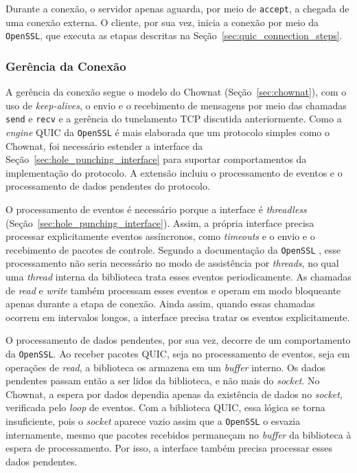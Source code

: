 Durante a conexão, o servidor apenas aguarda, por meio de \texttt{accept}, a chegada de uma conexão externa. O cliente, por sua vez, inicia a conexão por meio da \texttt{OpenSSL}, que executa as etapas descritas na Seção~\ref{sec:quic_connection_steps}.

\subsubsection{Gerência da Conexão}

A gerência da conexão segue o modelo do Chownat (Seção~\ref{sec:chownat}), com o uso de \textit{keep-alives}, o envio e o recebimento de mensagens por meio das chamadas \texttt{send} e \texttt{recv} e a gerência do tunelamento TCP discutida anteriormente. Como a \textit{engine} QUIC da \texttt{OpenSSL} é mais elaborada que um protocolo simples como o Chownat, foi necessário estender a interface da Seção~\ref{sec:hole_punching_interface} para suportar comportamentos da implementação do protocolo. A extensão incluiu o processamento de eventos e o processamento de dados pendentes do protocolo.

O processamento de eventos é necessário porque a interface é \textit{threadless} (Seção~\ref{sec:hole_punching_interface}). Assim, a própria interface precisa processar explicitamente eventos assíncronos, como \textit{timeouts} e o envio e o recebimento de pacotes de controle. Segundo a documentação da \texttt{OpenSSL} \citep{openssl_ssl_handle_events}, esse processamento não seria necessário no modo de assistência por \textit{threads}, no qual uma \textit{thread} interna da biblioteca trata esses eventos periodicamente. As chamadas de \textit{read} e \textit{write} também processam esses eventos e operam em modo bloqueante apenas durante a etapa de conexão. Ainda assim, quando essas chamadas ocorrem em intervalos longos, a interface precisa tratar os eventos explicitamente.

O processamento de dados pendentes, por sua vez, decorre de um comportamento da \texttt{OpenSSL}. Ao receber pacotes QUIC, seja no processamento de eventos, seja em operações de \textit{read}, a biblioteca os armazena em um \textit{buffer} interno. Os dados pendentes passam então a ser lidos da biblioteca, e não mais do \textit{socket}. No Chownat, a espera por dados dependia apenas da existência de dados no \textit{socket}, verificada pelo \textit{loop} de eventos. Com a biblioteca QUIC, essa lógica se torna insuficiente, pois o \textit{socket} aparece vazio assim que a \texttt{OpenSSL} o esvazia internamente, mesmo que pacotes recebidos permaneçam no \textit{buffer} da biblioteca à espera de processamento. Por isso, a interface também precisa processar esses dados pendentes.

